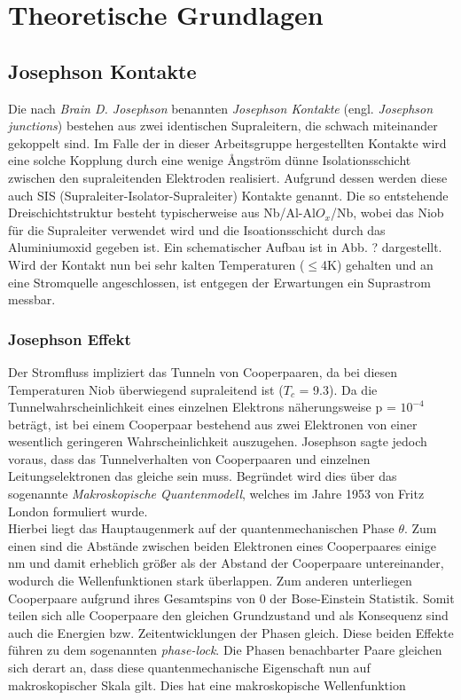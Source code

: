 \chapter{Theoretische Grundlagen}


\section{Josephson Kontakte}
Die nach \textit{Brain D. Josephson} benannten \textit{Josephson Kontakte} (engl. \textit{Josephson junctions}) bestehen aus zwei identischen Supraleitern, die schwach miteinander gekoppelt sind. Im Falle der in dieser Arbeitsgruppe hergestellten Kontakte wird eine solche Kopplung durch eine wenige \r{A}ngström dünne Isolationsschicht zwischen den supraleitenden Elektroden realisiert. Aufgrund dessen werden diese auch SIS (Supraleiter-Isolator-Supraleiter) Kontakte genannt. Die so entstehende Dreischichtstruktur besteht typischerweise aus Nb/Al-Al$O_x$/Nb, wobei das Niob für die Supraleiter verwendet wird und die Isoationsschicht durch das Aluminiumoxid gegeben ist. Ein schematischer Aufbau ist in Abb. ? dargestellt. 
Wird der Kontakt nun bei sehr kalten Temperaturen ($\leq$4K) gehalten und an eine Stromquelle angeschlossen, ist entgegen der Erwartungen ein Suprastrom messbar.
        
\subsection{Josephson Effekt}

Der Stromfluss impliziert das Tunneln von Cooperpaaren, da bei diesen Temperaturen Niob überwiegend supraleitend ist  (\texttt{${T_c}$} = 9.3). Da die Tunnelwahrscheinlichkeit eines einzelnen Elektrons näherungsweise p = $10^{-4}$ beträgt, ist bei einem Cooperpaar bestehend aus zwei Elektronen von einer wesentlich geringeren Wahrscheinlichkeit auszugehen. Josephson sagte jedoch voraus, dass das Tunnelverhalten von Cooperpaaren und einzelnen Leitungselektronen das gleiche sein muss. Begründet wird dies über das sogenannte \textit{Makroskopische Quantenmodell}, welches im Jahre 1953 von Fritz London formuliert wurde. \\
Hierbei liegt das Hauptaugenmerk auf der quantenmechanischen Phase $\theta$. Zum einen sind die Abstände zwischen beiden Elektronen eines Cooperpaares einige nm und damit erheblich größer als der Abstand der Cooperpaare untereinander, wodurch die Wellenfunktionen stark überlappen. Zum anderen unterliegen Cooperpaare aufgrund ihres Gesamtspins von 0 der Bose-Einstein Statistik. Somit teilen sich alle Cooperpaare den gleichen Grundzustand und als Konsequenz sind auch die Energien bzw. Zeitentwicklungen der Phasen gleich. Diese beiden Effekte führen zu dem sogenannten \textit{phase-lock}. Die Phasen benachbarter Paare gleichen sich derart an, dass diese quantenmechanische Eigenschaft nun auf makroskopischer Skala gilt. Dies hat eine makroskopische Wellenfunktion 

